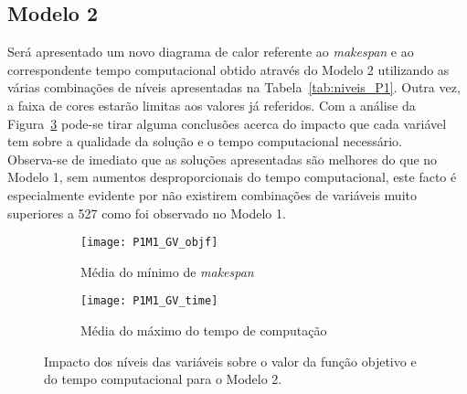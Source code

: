 \subsection{Modelo 2}

Será apresentado um novo diagrama de calor referente ao \textit{makespan} e ao correspondente tempo computacional obtido através do Modelo 2 utilizando as várias combinações de níveis apresentadas na Tabela~\ref{tab:niveis_P1}. Outra vez, a faixa de cores estarão limitas aos valores já referidos. Com a análise da Figura~\ref{fig:P1M1_GV} pode-se tirar alguma conclusões acerca do impacto que cada variável tem sobre a qualidade da solução e o tempo computacional necessário.\\

Observa-se de imediato que as soluções apresentadas são melhores do que no Modelo 1, sem aumentos desproporcionais do tempo computacional, este facto é especialmente evidente por não existirem combinações de variáveis muito superiores a 527 como foi observado no Modelo 1.\\
\begin{figure}[h]
	\centering
	\begin{subfigure}{0.49\textwidth}
	\centering
		\texttt{[image: P1M1\_GV\_objf]}
		\caption{Média do mínimo de \textit{makespan}}
		\label{fig:P1M1_GV_objf}
	\end{subfigure}
	\begin{subfigure}{0.49\textwidth}
	\centering
		\texttt{[image: P1M1\_GV\_time]}
		\caption{Média do máximo do tempo de computação}
		\label{fig:P1M1_GV_time}
	\end{subfigure}
	\caption{Impacto dos níveis das variáveis sobre o valor da função objetivo e do tempo computacional para o Modelo 2.}
	\label{fig:P1M1_GV}
\end{figure}

